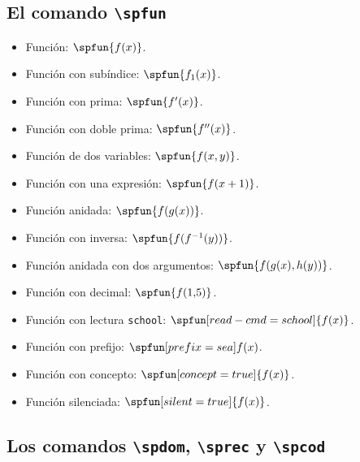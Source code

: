 \documentclass{article}
\begin{document}
\subsection*{El comando \texttt{\textbackslash spfun}}

\begin{itemize}
  \item Función: $\spfun{f(x)}$.
  \item Función con subíndice: $\spfun{f_{1}(x)}$.
  \item Función con prima: $\spfun{f'(x)}$.
  \item Función con doble prima: $\spfun{f''(x)}$.
  \item Función de dos variables: $\spfun{f(x,y)}$.
  \item Función con una expresión: $\spfun{f(x+1)}$.
  \item Función anidada: $\spfun{f(g(x))}$.
  \item Función con inversa: $\spfun{f(f^{-1}(y))}$.
  \item Función anidada con dos argumentos: $\spfun{f(g(x),h(y))}$.
  \item Función con decimal: $\spfun{f(1{,}5)}$.
  \item Función con lectura \texttt{school}: $\spfun[read-cmd=school]{f(x)}$.
  \item Función con prefijo: $\spfun[prefix={sea}]{f(x)}$.
  \item Función con concepto: $\spfun[concept=true]{f(x)}$.
  \item Función silenciada: $\spfun[silent=true]{f(x)}$.
\end{itemize}

\subsection*{Los comandos \texttt{\textbackslash spdom}, \texttt{\textbackslash sprec} y \texttt{\textbackslash spcod}}
\end{document}
